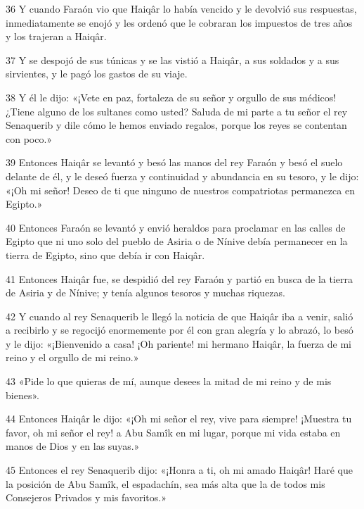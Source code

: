 \par 36 Y cuando Faraón vio que Haiqâr lo había vencido y le devolvió sus respuestas, inmediatamente se enojó y les ordenó que le cobraran los impuestos de tres años y los trajeran a Haiqâr.

\par 37 Y se despojó de sus túnicas y se las vistió a Haiqâr, a sus soldados y a sus sirvientes, y le pagó los gastos de su viaje.

\par 38 Y él le dijo: «¡Vete en paz, fortaleza de su señor y orgullo de sus médicos! ¿Tiene alguno de los sultanes como usted? Saluda de mi parte a tu señor el rey Senaquerib y dile cómo le hemos enviado regalos, porque los reyes se contentan con poco.»

\par 39 Entonces Haiqâr se levantó y besó las manos del rey Faraón y besó el suelo delante de él, y le deseó fuerza y ​​continuidad y abundancia en su tesoro, y le dijo: «¡Oh mi señor! Deseo de ti que ninguno de nuestros compatriotas permanezca en Egipto.»

\par 40 Entonces Faraón se levantó y envió heraldos para proclamar en las calles de Egipto que ni uno solo del pueblo de Asiria o de Nínive debía permanecer en la tierra de Egipto, sino que debía ir con Haiqâr.

\par 41 Entonces Haiqâr fue, se despidió del rey Faraón y partió en busca de la tierra de Asiria y de Nínive; y tenía algunos tesoros y muchas riquezas.

\par 42 Y cuando al rey Senaquerib le llegó la noticia de que Haiqâr iba a venir, salió a recibirlo y se regocijó enormemente por él con gran alegría y lo abrazó, lo besó y le dijo: «¡Bienvenido a casa! ¡Oh pariente! mi hermano Haiqâr, la fuerza de mi reino y el orgullo de mi reino.»

\par 43 «Pide lo que quieras de mí, aunque desees la mitad de mi reino y de mis bienes».

\par 44 Entonces Haiqâr le dijo: «¡Oh mi señor el rey, vive para siempre! ¡Muestra tu favor, oh mi señor el rey! a Abu Samîk en mi lugar, porque mi vida estaba en manos de Dios y en las suyas.»

\par 45 Entonces el rey Senaquerib dijo: «¡Honra a ti, oh mi amado Haiqâr! Haré que la posición de Abu Samîk, el espadachín, sea más alta que la de todos mis Consejeros Privados y mis favoritos.»

